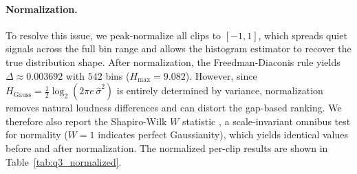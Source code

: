 \documentclass[a4paper,10pt]{article}
\theoremstyle{nonumberplain}
\theoremstyle{nonumberplain}
\theoremstyle{nonumberplain}
\theoremstyle{nonumberplain}
\begin{document}
\paragraph{Normalization.}
To resolve this issue, we peak-normalize all clips to $[-1, 1]$, which spreads quiet signals across the full bin range and allows the histogram estimator to recover the true distribution shape. After normalization, the Freedman-Diaconis rule yields $\Delta \approx 0.003692$ with $542$ bins ($H_{\max} = 9.082$). However, since $H_{\text{Gauss}} = \frac{1}{2}\log_2(2\pi e\,\hat{\sigma}^2)$ is entirely determined by variance, normalization removes natural loudness differences and can distort the gap-based ranking. We therefore also report the Shapiro-Wilk $W$ statistic \citep{shapiro1965}, a scale-invariant omnibus test for normality ($W = 1$ indicates perfect Gaussianity), which yields identical values before and after normalization. The normalized per-clip results are shown in Table~\ref{tab:q3_normalized}.
\end{document}

